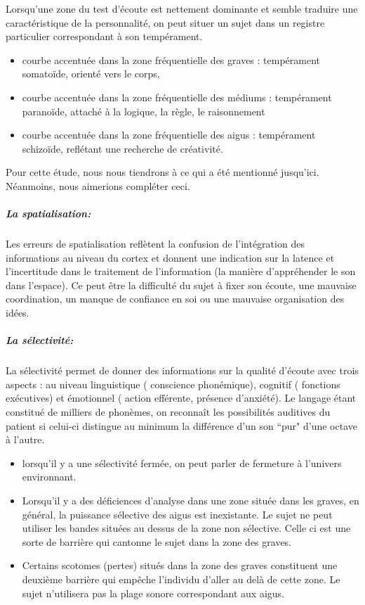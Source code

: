 Lorsqu'une zone du test d'écoute est nettement dominante et semble
traduire une caractéristique de la personnalité, on peut situer un
sujet dans un registre particulier correspondant à son tempérament.

\begin{itemize}
	\item courbe accentuée dans la zone fréquentielle des graves : tempérament
	somatoïde, orienté vers le corps,
	
	\item courbe accentuée dans la zone fréquentielle des médiums : tempérament
	paranoïde, attaché à la logique, la règle, le raisonnement 
	
	\item courbe accentuée dans la zone fréquentielle des aigus : tempérament
	schizoïde, reflétant une recherche de créativité. 
\end{itemize}



Pour cette étude, nous nous tiendrons à ce qui a été mentionné jusqu'ici.   
Néanmoins, nous aimerions compléter ceci.

\subparagraph{La spatialisation: }


Les erreurs de spatialisation reflètent la confusion
de l'intégration des informations au niveau du cortex et donnent une indication sur la latence et l'incertitude
dans le traitement de l'information (la manière d'appréhender le
son dans l'espace). Ce peut être la difficulté du sujet à fixer son
écoute, une mauvaise coordination, un manque de confiance en soi ou
une mauvaise organisation des idées.

\subparagraph{La sélectivité: }


La sélectivité permet de donner des informations sur la
qualité d'écoute avec trois aspects : au niveau linguistique ( conscience
phonémique), cognitif ( fonctions exécutives) et émotionnel ( action
efférente, présence d'anxiété).
Le langage étant constitué de milliers de phonèmes, on reconnaît les possibilités auditives du patient si celui-ci  distingue au minimum la différence d'un son ``pur" d'une octave à l'autre.  

\begin{itemize}
\item lorsqu'il y a une sélectivité fermée, on peut parler de fermeture
à l'univers environnant.
\item Lorsqu'il y a des déficiences d'analyse dans une zone située dans
les graves, en général, la puissance sélective des aigus est inexistante.
Le sujet ne peut utiliser les bandes situées au dessus de la zone
non sélective. Celle ci est une sorte de barrière qui cantonne le
sujet dans la zone des graves. 
\item Certains scotomes (pertes) situés dans la zone des graves constituent
une deuxième barrière qui empêche l'individu d'aller au delà de cette
zone. Le sujet n'utilisera pas la plage sonore correspondant aux aigus. 
\end{itemize}



